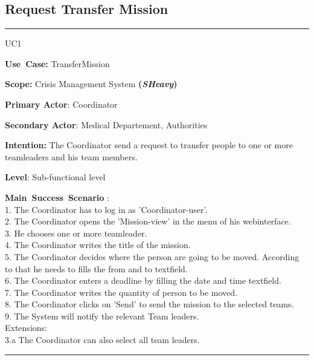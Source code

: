 \subsection{Request Transfer Mission}
\vspace{0.5cm}
\hrule
\vspace{0.5cm}
\begin{lyxlist}{UC1}
\small{
\item [\textbf{Use~Case:}] TransferMission
\item [\textbf{Scope:}] Crisis Management System \textbf{(\emph{SHeavy})}
\item [\textbf{Primary Actor}:] Coordinator
\item [\textbf{Secondary Actor}:] Medical Departement, Authorities
\item [\textbf{Intention:}]The Coordinator send a request to transfer people
to one or more teamleaders and his team members.
\item [\textbf{Level}:]Sub-functional level
\item [\textbf{Main~Success~Scenario}]:\\
1. The Coordinator has to log in as 'Coordinator-user'.\\
2. The Coordinator opens the 'Mission-view' in the menu of his webinterface.\\
3. He chooses one or more teamleader.\\
4. The Coordinator writes the title of the mission.\\
5. The Coordinator decides where the person are going to be moved. According to
that he needs to fills the from and to textfield.\\
6. The Coordinator enters a deadline by filling the date and time textfield.\\
7. The Coordinator writes the quantity of person to be moved.\\
8. The Coordinator clicks on 'Send' to send the mission to the selected
teams.\\
9. The System will notify the relevant Team leaders.\\
Extensions:\\
	3.a The Coordinator can also select all team leaders.\\
}
\end{lyxlist}
\hrule 
\vspace{0.5cm} 

